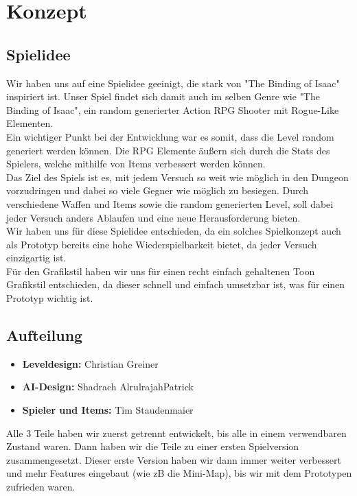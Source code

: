 \section{Konzept}

\subsection{Spielidee}
Wir haben uns auf eine Spielidee geeinigt, die stark von "The Binding of Isaac" inspiriert ist. Unser Spiel findet sich damit auch im selben Genre wie "The Binding of Isaac", ein random generierter Action RPG Shooter mit Rogue-Like Elementen.\\
Ein wichtiger Punkt bei der Entwicklung war es somit, dass die Level random generiert werden können. Die RPG Elemente äußern sich durch die Stats des Spielers, welche mithilfe von Items verbessert werden können. \\
Das Ziel des Spiels ist es, mit jedem Versuch so weit wie möglich in den Dungeon vorzudringen und dabei so viele Gegner wie möglich zu besiegen. Durch verschiedene Waffen und Items sowie die random generierten Level, soll dabei jeder Versuch anders Ablaufen und eine neue Herausforderung bieten.\\
Wir haben uns für diese Spielidee entschieden, da ein solches Spielkonzept auch als Prototyp bereits eine hohe Wiederspielbarkeit bietet, da jeder Versuch einzigartig ist.\\
Für den Grafikstil haben wir uns für einen recht einfach gehaltenen Toon Grafikstil entschieden, da dieser schnell und einfach umsetzbar ist, was für einen Prototyp wichtig ist.

\subsection{Aufteilung}
\begin{itemize}
\item \textbf{Leveldesign:} Christian Greiner
\item \textbf{AI-Design:} Shadrach AlrulrajahPatrick
\item \textbf{Spieler und Items:} Tim Staudenmaier
\end{itemize}
Alle 3 Teile haben wir zuerst getrennt entwickelt, bis alle in einem verwendbaren Zustand waren. Dann haben wir die Teile zu einer ersten Spielversion zusammengesetzt. Dieser erste Version haben wir dann immer weiter verbessert und mehr Features eingebaut (wie zB die Mini-Map), bis wir mit dem Prototypen zufrieden waren.

